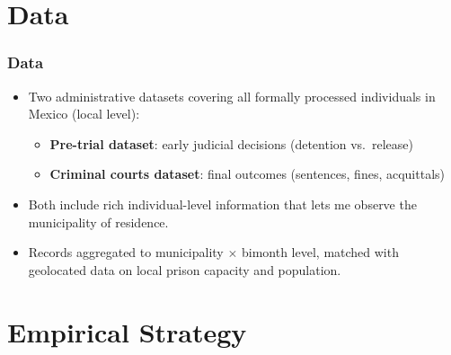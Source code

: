 \documentclass[10pt,aspectratio=169]{beamer}
\begin{document}
\section{Data}

\begin{frame}
\frametitle{Data}
\small
\begin{itemize}\setlength\itemsep{0.65em}
    \item Two administrative datasets covering all formally processed individuals in Mexico (local level):
    \begin{itemize}\setlength\itemsep{0.65em}
        \item \textbf{Pre-trial dataset}: early judicial decisions (detention vs.\ release) %
        \item \textbf{Criminal courts dataset}: final outcomes (sentences, fines, acquittals)
    \end{itemize}
    \pause
    \item Both include rich individual-level information that lets me observe the \alert{municipality of residence}.
    \item Records aggregated to \alert{municipality $\times$ bimonth} level, matched with geolocated data on \alert{local prison capacity and population}.
    
    
\end{itemize}
\end{frame}

\section{Empirical Strategy}
\end{document}
